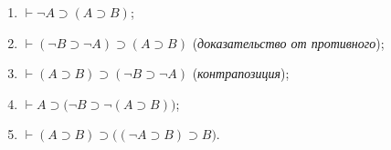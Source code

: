 \begin{lemma}\leavevmode
    \begin{enumerate}[label=\arabic*)]
        \item $\vdash \neg A \supset (A \supset B)$;
        \item $\vdash (\neg B \supset \neg A) \supset (A \supset B)$ (\textit{доказательство от противного});
        \item\label{item:contraposition} $\vdash (A \supset B) \supset (\neg B \supset \neg A)$ (\textit{контрапозиция});
        \item $\vdash A \supset \big(\neg B \supset \neg(A \supset B)\big)$;
        \item $\vdash (A \supset B) \supset \big((\neg A \supset B) \supset B\big)$.
    \end{enumerate}
\end{lemma}
